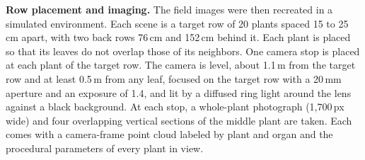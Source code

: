 \documentclass[10pt,twocolumn,letterpaper]{article}
\begin{document}
\noindent\textbf{Row placement and imaging.}
The field images were then recreated in a simulated environment. Each scene is a target row of 20 plants spaced 15 to
25\,cm apart, with two back rows 76\,cm and 152\,cm behind it. Each plant is placed so that its leaves do not overlap
those of its neighbors. One camera stop is placed at each plant of the target row. The camera is level, about 1.1\,m
from the target row and at least 0.5\,m from any leaf, focused on the target row with a 20\,mm aperture and an exposure
of 1.4, and lit by a diffused ring light around the lens against a black background. At each stop, a whole-plant
photograph (1{,}700\,px wide) and four overlapping vertical sections of the middle plant are taken. Each comes with a
camera-frame point cloud labeled by plant and organ and the procedural parameters of every plant in view.


\FloatBarrier
\clearpage
\end{document}
